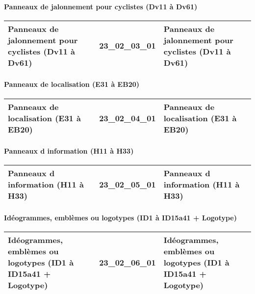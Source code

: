 \documentclass[12pt,titlepage,oneside]{book}
\begin{document}
\paragraph{Panneaux de jalonnement pour cyclistes (Dv11 à Dv61)}
\noindent
\vspace{\baselineskip}

\renewcommand{\arraystretch}{1.2}
\begin{supertabular}{|p{10cm}|c|p{15cm}|}
 Panneaux de jalonnement pour cyclistes (Dv11 à Dv61) & 23\_02\_03\_01 & Panneaux de jalonnement pour cyclistes (Dv11 à Dv61)\\
\hline
\end{supertabular}


\paragraph{Panneaux de localisation (E31 à EB20)}
\noindent
\vspace{\baselineskip}

\renewcommand{\arraystretch}{1.2}
\begin{supertabular}{|p{10cm}|c|p{15cm}|}
 Panneaux de localisation (E31 à EB20) & 23\_02\_04\_01 & Panneaux de localisation (E31 à EB20)\\
\hline
\end{supertabular}


\paragraph{Panneaux d information (H11 à H33)}
\noindent
\vspace{\baselineskip}

\renewcommand{\arraystretch}{1.2}
\begin{supertabular}{|p{10cm}|c|p{15cm}|}
 Panneaux d information (H11 à H33) & 23\_02\_05\_01 & Panneaux d information (H11 à H33)\\
\hline
\end{supertabular}


\paragraph{Idéogrammes, emblèmes ou logotypes (ID1 à ID15a41 + Logotype)}
\noindent
\vspace{\baselineskip}

\renewcommand{\arraystretch}{1.2}
\begin{supertabular}{|p{10cm}|c|p{15cm}|}
 Idéogrammes, emblèmes ou logotypes (ID1 à ID15a41 + Logotype) & 23\_02\_06\_01 & Idéogrammes, emblèmes ou logotypes (ID1 à ID15a41 + Logotype)\\
\hline
\end{supertabular}
\end{document}
